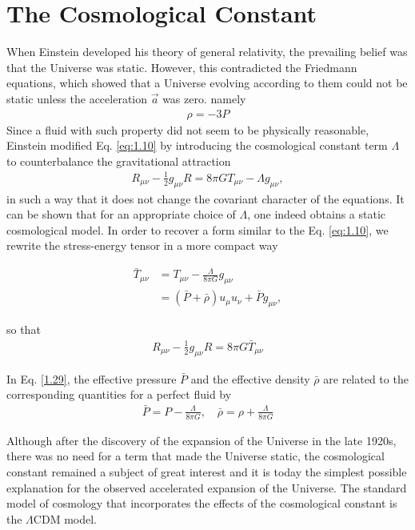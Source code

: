 
\section{The Cosmological Constant}
\hspace{0.5cm}When Einstein developed his theory of general relativity, the prevailing belief was that the Universe was static. However, this contradicted the Friedmann equations, which showed that a Universe
evolving according to them could not be static unless the acceleration  $\vec{a}$ was zero. namely
\begin{align}
   \rho=-3 P \label{1.26}
\end{align}
Since a fluid with such property did not seem to be physically reasonable, Einstein modified Eq. \eqref{eq:1.10} by introducing the cosmological constant term $\Lambda$ to counterbalance the gravitational attraction
\begin{align}
    R_{\mu \nu}-\frac{1}{2} g_{\mu \nu} R=8 \pi G T_{\mu \nu}-\Lambda g_{\mu \nu},\label{1.27}
\end{align}
 in such a way that it does not change the covariant character of the equations. It can be shown that for an appropriate choice of $\Lambda$, one indeed obtains a static cosmological model.
In order to recover a form similar to the Eq. \eqref{eq:1.10}, we rewrite the stress-energy tensor in a more compact way

\begin{align}
    \bar{T}_{\mu \nu} & =T_{\mu \nu}-\frac{\Lambda}{8 \pi G} g_{\mu \nu} \\ & =(\bar{P}+\bar{\rho}) u_\mu u_\nu+\bar{P} g_{\mu \nu}, \label{1.29}
\end{align}

so that
\begin{align}
    R_{\mu \nu}-\frac{1}{2} g_{\mu \nu} R=8 \pi G \bar{T}_{\mu \nu}\label{1.30}
\end{align}


In Eq. \eqref{1.29}, the effective pressure $\bar{P}$ and the effective density $\bar{\rho}$ are related to the corresponding quantities for a perfect fluid by
\begin{align}
    \bar{P}=P-\frac{\Lambda}{8 \pi G}, \quad \bar{\rho}=\rho+\frac{\Lambda}{8 \pi G}\label{1.31}
\end{align}

Although after the discovery of the expansion of the Universe in the late 1920s, there was no need for a term that made the Universe static, the cosmological constant remained a subject of great interest and it is today the simplest possible explanation for the observed accelerated expansion of the Universe. The standard model of cosmology that incorporates the effects of the cosmological constant is the $\Lambda$CDM model.

